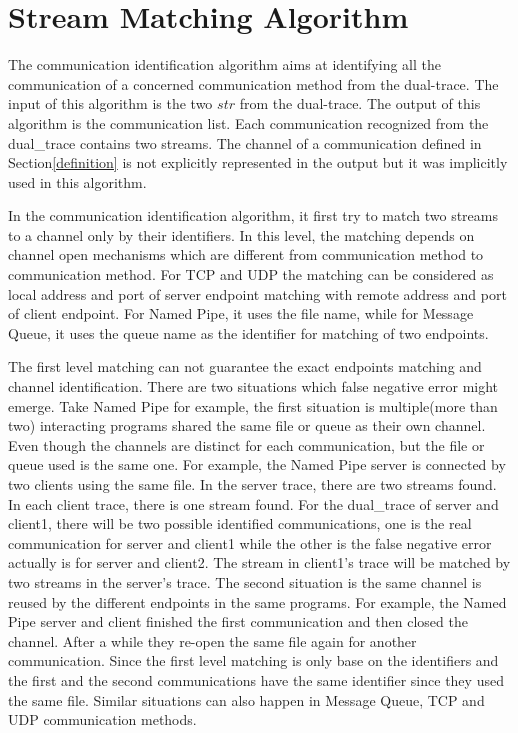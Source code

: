 \section{Stream Matching Algorithm}\label{streammatch}
The communication identification algorithm aims at identifying all the communication of a concerned communication method from the dual-trace. The input of this algorithm is the two $str$ from the dual-trace. The output of this algorithm is the communication list. Each communication recognized from the dual\_trace contains two streams. The channel of a communication defined in Section\ref{definition} is not explicitly represented in the output but it was implicitly used in this algorithm. 

In the communication identification algorithm, it first try to match two streams to a channel only by their identifiers. In this level, the matching depends on channel open mechanisms which are different from communication method to communication method. For TCP and UDP the matching can be considered as local address and port of server endpoint matching with remote address and port of client endpoint. For Named Pipe, it uses the file name, while for Message Queue, it uses the queue name as the identifier for matching of two endpoints. 

The first level matching can not guarantee the exact endpoints matching and channel identification. There are two situations which false negative error might emerge. Take Named Pipe for example, the first situation is multiple(more than two) interacting programs shared the same file or queue as their own channel. Even though the channels are distinct for each communication, but the file or queue used is the same one. For example, the Named Pipe server is connected by two clients using the same file. In the server trace, there are two streams found. In each client trace, there is one stream found. For the dual\_trace of server and client1, there will be two possible identified communications, one is the real communication for server and client1 while the other is the false negative error actually is for server and client2. The stream in client1's trace will be matched by two streams in the server's trace. The second situation is the same channel is reused by the different endpoints in the same programs. For example, the Named Pipe server and client finished the first communication and then closed the channel. After a while they re-open the same file again for another communication. Since the first level matching is only base on the identifiers and the first and the second communications have the same identifier since they used the same file. Similar situations can also happen in Message Queue, TCP and UDP communication methods. 

